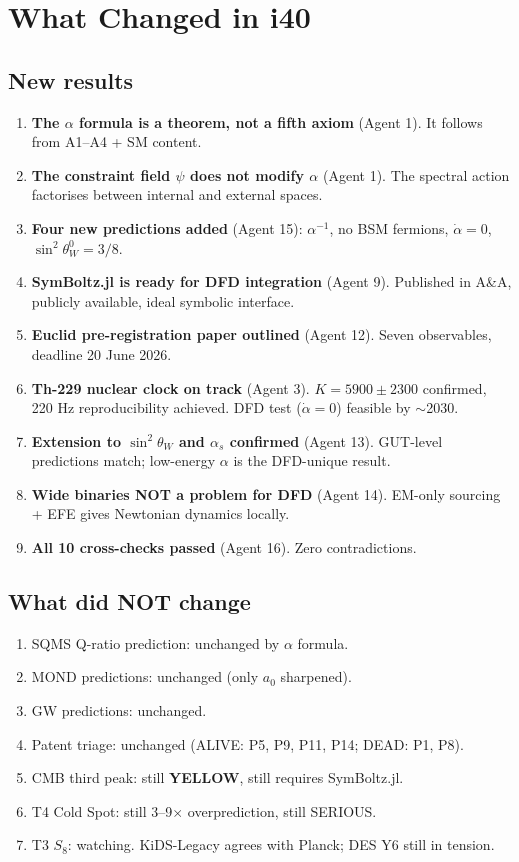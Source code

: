\documentclass[11pt,a4paper]{article}
\newcommand{\YELLOW}{\textcolor{dfdyellow}{\textbf{YELLOW}}}
\begin{document}
\section{What Changed in i40}

\subsection{New results}

\begin{enumerate}
\item \textbf{The $\alpha$ formula is a theorem, not a fifth axiom} (Agent 1). It follows from A1--A4 + SM content.
\item \textbf{The constraint field $\psi$ does not modify $\alpha$} (Agent 1). The spectral action factorises between internal and external spaces.
\item \textbf{Four new predictions added} (Agent 15): $\alpha^{-1}$, no BSM fermions, $\dot{\alpha} = 0$, $\sin^2\theta_W^0 = 3/8$.
\item \textbf{SymBoltz.jl is ready for DFD integration} (Agent 9). Published in A\&A, publicly available, ideal symbolic interface.
\item \textbf{Euclid pre-registration paper outlined} (Agent 12). Seven observables, deadline 20 June 2026.
\item \textbf{Th-229 nuclear clock on track} (Agent 3). $K = 5900 \pm 2300$ confirmed, 220 Hz reproducibility achieved. DFD test ($\dot{\alpha} = 0$) feasible by $\sim$2030.
\item \textbf{Extension to $\sin^2\theta_W$ and $\alpha_s$ confirmed} (Agent 13). GUT-level predictions match; low-energy $\alpha$ is the DFD-unique result.
\item \textbf{Wide binaries NOT a problem for DFD} (Agent 14). EM-only sourcing + EFE gives Newtonian dynamics locally.
\item \textbf{All 10 cross-checks passed} (Agent 16). Zero contradictions.
\end{enumerate}

\subsection{What did NOT change}

\begin{enumerate}
\item SQMS Q-ratio prediction: unchanged by $\alpha$ formula.
\item MOND predictions: unchanged (only $a_0$ sharpened).
\item GW predictions: unchanged.
\item Patent triage: unchanged (ALIVE: P5, P9, P11, P14; DEAD: P1, P8).
\item CMB third peak: still \YELLOW{}, still requires SymBoltz.jl.
\item T4 Cold Spot: still 3--9$\times$ overprediction, still SERIOUS.
\item T3 $S_8$: watching. KiDS-Legacy agrees with Planck; DES Y6 still in tension.
\end{enumerate}
\end{document}
